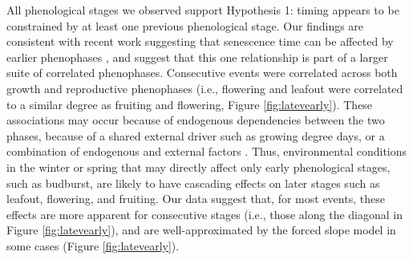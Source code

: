 \documentclass{article}
\begin{document}
\par All phenological stages we observed support Hypothesis 1: timing appears to be constrained by at least one previous phenological stage. Our findings are consistent with recent work suggesting that senescence time can be affected by earlier phenophases \citep{keenan2015,liu2016,li2016}, and suggest that this one relationship is part of a larger suite of correlated phenophases. Consecutive events were correlated across both growth and reproductive phenophases (i.e., flowering and leafout were correlated to a similar degree as fruiting and flowering, Figure \ref{fig:latevearly}). These associations may occur because of endogenous dependencies between the two phases, because of a shared external driver such as growing degree days, or a combination of endogenous and external factors \citep{lechowicz1995}. Thus, environmental conditions in the winter or spring that may directly affect only early phenological stages, such as budburst, are likely to have cascading effects on later stages such as leafout, flowering, and fruiting. Our data suggest that, for most events, these effects are more apparent for consecutive stages (i.e., those along the diagonal in Figure \ref{fig:latevearly}), and are well-approximated by the forced slope model in some cases (Figure \ref{fig:latevearly}).
\end{document}
